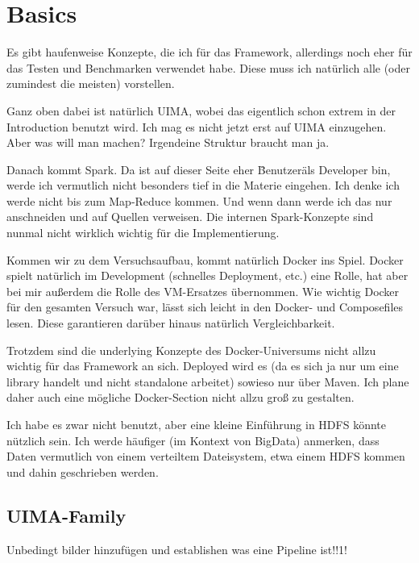 
\chapter{Basics}
\label{ch:basics}

Es gibt haufenweise Konzepte, die ich für das Framework, allerdings noch eher für das Testen und Benchmarken verwendet habe. Diese muss ich natürlich alle (oder zumindest die meisten) vorstellen.

Ganz oben dabei ist natürlich UIMA, wobei das eigentlich schon extrem in der Introduction benutzt wird. Ich mag es nicht jetzt erst auf UIMA einzugehen. Aber was will man machen? Irgendeine Struktur braucht man ja.

Danach kommt Spark. Da ist auf dieser Seite eher \"Benutzer\" als Developer bin, werde ich vermutlich nicht besonders tief in die Materie eingehen. Ich denke ich werde nicht bis zum Map-Reduce kommen. Und wenn dann werde ich das nur anschneiden und auf Quellen verweisen. Die internen Spark-Konzepte sind nunmal nicht wirklich wichtig für die Implementierung.

Kommen wir zu dem Versuchsaufbau, kommt natürlich Docker ins Spiel. Docker spielt natürlich im Development (schnelles Deployment, etc.) eine Rolle, hat aber bei mir außerdem die Rolle des VM-Ersatzes übernommen. Wie wichtig Docker für den gesamten Versuch war, lässt sich leicht in den Docker- und Composefiles lesen. Diese garantieren darüber hinaus natürlich Vergleichbarkeit.

Trotzdem sind die underlying Konzepte des Docker-Universums nicht allzu wichtig für das Framework an sich. Deployed wird es (da es sich ja nur um eine library handelt und nicht standalone arbeitet) sowieso nur über Maven. Ich plane daher auch eine mögliche Docker-Section nicht allzu groß zu gestalten.

Ich habe es zwar nicht benutzt, aber eine kleine Einführung in HDFS könnte nützlich sein. Ich werde häufiger (im Kontext von BigData) anmerken, dass Daten vermutlich von einem verteiltem Dateisystem, etwa einem HDFS kommen und dahin geschrieben werden.

\section{UIMA-Family}

 

Unbedingt bilder hinzufügen und establishen was eine Pipeline ist!!1!

